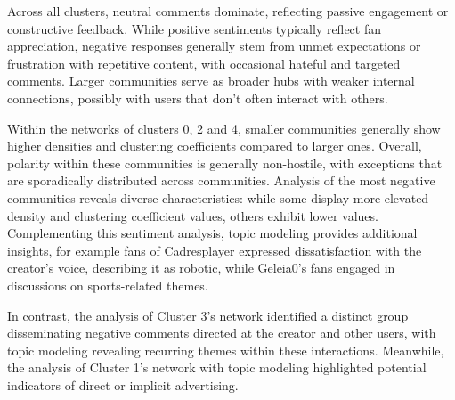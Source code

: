 \documentclass[12pt]{article}
\begin{document}

Across all clusters, neutral comments dominate, reflecting passive engagement or constructive feedback.
While positive sentiments typically reflect fan appreciation, 
negative responses generally stem from unmet expectations or frustration with repetitive content, with 
occasional hateful and targeted comments. 
Larger communities serve as broader hubs with weaker internal connections,
possibly with users that don't often interact with others.

Within the networks of clusters 0, 2 and 4, smaller communities generally show higher densities and 
clustering coefficients compared to larger ones. Overall, polarity within these communities is generally 
non-hostile, with exceptions that are sporadically distributed across communities. 
Analysis of the most negative communities reveals diverse characteristics: 
while some display more elevated density and clustering coefficient values, 
others exhibit lower values. Complementing this sentiment analysis, topic modeling provides additional insights,
for example fans of Cadresplayer expressed dissatisfaction with the creator's voice, 
describing it as robotic, while Geleia0's fans engaged in discussions on sports-related themes.

In contrast, the analysis of Cluster 3's network identified a distinct group disseminating negative 
comments directed at the creator and other users, with topic modeling revealing recurring themes within 
these interactions. Meanwhile, the analysis of Cluster 1's network with topic modeling highlighted 
potential indicators of direct or implicit advertising.
\end{document}
